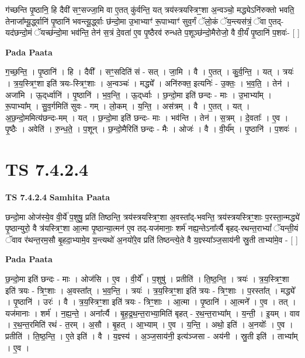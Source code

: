 \documentclass[17pt]{extarticle}
\begin{document}
ग॑च्छन्ति पृ॒ष्ठानि॒ हि दैवी॑ सꣳ॒॒सज्जा॒मि वा ए॒तत् कु॑र्वन्ति॒ यत् त्रय॑स्त्रयस्त्रिꣳ॒॒शा अ॒न्वञ्चो॒ मद्ध्येऽनि॑रुक्तो भवति॒ तेनाजा᳚म्यू॒र्द्ध्वानि॑ पृ॒ष्ठानि॑ भवन्त्यू॒र्द्ध्वाः छ॑न्दो॒मा उ॒भाभ्याꣳ॑ रू॒पाभ्याꣳ॑ सुव॒र्गं ॅलो॒कं ॅय॒न्त्यस॑त्रं॒ ॅवा ए॒तद्-यद॑छन्दो॒मं ॅयच्छ॑न्दो॒मा भव॑न्ति॒ तेन॑ स॒त्रं दे॒वता॑ ए॒व पृ॒ष्ठैरव॑ रुन्धते प॒शूञ्छ॑न्दो॒मैरोजो॒ वै वी॒र्यं॑ पृ॒ष्ठानि॑ प॒शवः॑- [  ] \newline

\textbf{Pada Paata} \newline

ग॒च्छ॒न्ति॒ । पृ॒ष्ठानि॑ । हि । दैवी᳚ । सꣳ॒॒सदिति॑ सं - सत् । जा॒मि । वै । ए॒तत् । कु॒र्व॒न्ति॒ । यत् । त्रयः॑ । त्र॒य॒स्त्रिꣳ॒॒शा इति॑ त्रयः-स्त्रिꣳ॒॒शाः । अ॒न्वञ्चः॑ । मद्ध्ये᳚ । अनि॑रुक्त॒ इत्यनिः॑ - उ॒क्तः॒ । भ॒व॒ति॒ । तेन॑ । अजा॑मि । ऊ॒द्‌र्ध्वानि॑ । पृ॒ष्ठानि॑ । भ॒व॒न्ति॒ । ऊ॒द्‌र्ध्वाः । छ॒न्दो॒मा इति॑ छन्दः - माः । उ॒भाभ्या᳚म् । रू॒पाभ्या᳚म् । सु॒व॒र्गमिति॑ सुवः - गम् । लो॒कम् । य॒न्ति॒ । अस॑त्रम् । वै । ए॒तत् । यत् । अ॒छ॒न्दो॒ममित्य॑छन्दः-मम् । यत् । छ॒न्दो॒मा इति॑ छन्दः- माः । भव॑न्ति । तेन॑ । स॒त्रम् । दे॒वताः᳚ । ए॒व । पृ॒ष्ठैः । अवेति॑ । रु॒न्ध॒ते॒ । प॒शून् । छ॒न्दो॒मैरिति॑ छन्दः - मैः । ओजः॑ । वै । वी॒र्य᳚म् । पृ॒ष्ठानि॑ । प॒शवः॑ ।  \newline





\section{ TS 7.4.2.4 }

\textbf{TS 7.4.2.4 } \newline
\textbf{Samhita Paata} \newline

छन्दो॒मा ओज॑स्ये॒व वी॒र्ये॑ प॒शुषु॒ प्रति॑ तिष्ठन्ति॒ त्रय॑स्त्रयस्त्रिꣳ॒॒शा अ॒वस्ता᳚द्-भवन्ति॒ त्रय॑स्त्रयस्त्रिꣳ॒॒शाः प॒रस्ता॒न्मद्ध्ये॑ पृ॒ष्ठान्युरो॒ वै त्र॑यस्त्रिꣳ॒॒शा आ॒त्मा पृ॒ष्ठान्या॒त्मन॑ ए॒व तद्-यज॑मानाः॒ शर्म॑ नह्य॒न्तेऽना᳚र्त्यै बृहद्-रथन्त॒राभ्यां᳚ ॅयन्ती॒यं ॅवाव र॑थन्त॒रम॒सौ बृ॒हदा॒भ्यामे॒व य॒न्त्यथो॑ अ॒नयो॑रे॒व प्रति॑ तिष्ठन्त्ये॒ते वै य॒ज्ञ्स्या᳚ञ्ज॒साय॑नी स्रु॒ती ताभ्या॑मे॒व - [  ] \newline

\textbf{Pada Paata} \newline

छ॒न्दो॒मा इति॑ छन्दः - माः । ओज॑सि । ए॒व । वी॒र्ये᳚ । प॒शुषु॑ । प्रतीति॑ । ति॒ष्ठ॒न्ति॒ । त्रयः॑ । त्र॒य॒स्त्रिꣳ॒॒शा इति॑ त्रयः - त्रिꣳ॒॒शाः । अ॒वस्ता᳚त् । भ॒व॒न्ति॒ । त्रयः॑ । त्र॒य॒स्त्रिꣳ॒॒शा इति॑ त्रयः - त्रिꣳ॒॒शाः । प॒रस्ता᳚त् । मद्ध्ये᳚ । पृ॒ष्ठानि॑ । उरः॑ । वै । त्र॒य॒स्त्रिꣳ॒॒शा इति॑ त्रयः - त्रिꣳ॒॒शाः । आ॒त्मा । पृ॒ष्ठानि॑ । आ॒त्मने᳚ । ए॒व । तत् । यज॑मानाः । शर्म॑ । न॒ह्य॒न्ते॒ । अना᳚र्त्यै । बृ॒ह॒द्र॒थ॒न्त॒राभ्या॒मिति॑ बृहत् - र॒थ॒न्त॒राभ्या᳚म् । य॒न्ती॒ । इ॒यम् । वाव । र॒थ॒न्त॒रमिति॑ रथं - त॒रम् । अ॒सौ । बृ॒हत् । आ॒भ्याम् । ए॒व । य॒न्ति॒ । अथो॒ इति॑ । अ॒नयोः᳚ । ए॒व । प्रतीति॑ । ति॒ष्ठ॒न्ति॒ । ए॒ते इति॑ । वै । य॒ज्ञ्स्य॑ । अ॒ञ्ज॒साय॑नी॒ इत्य॑ञ्जसा - अय॑नी । स्रु॒ती इति॑ । ताभ्या᳚म् । ए॒व ।  \newline
\end{document}
